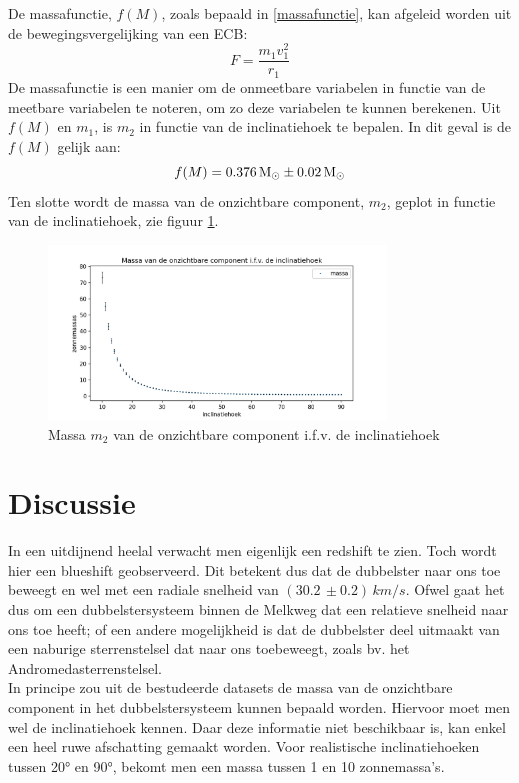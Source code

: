 \documentclass[12pt]{article}
\begin{document}
	
	\pagebreak
	\noindent
	De massafunctie, $f(M)$, zoals bepaald in \eqref{massafunctie}, kan afgeleid worden uit de bewegingsvergelijking van een ECB:
	\begin{equation}
	F = \frac{m_1 v_1^2}{r_1}
	\end{equation}
	De massafunctie is een manier om de onmeetbare variabelen in functie van de meetbare variabelen te noteren, om zo deze variabelen te kunnen berekenen.
	Uit $f(M)$ en $m_1$, is $m_2$ in functie van de inclinatiehoek te bepalen. In dit geval is de $f(M)$ gelijk aan:
	\begin{equation}
		f(M) = 0.376 \,\textup{M}_\odot \pm 0.02\,\textup{M}_\odot
	\end{equation} 
	Ten slotte wordt de massa van de onzichtbare component, $m_2$, geplot in functie van de inclinatiehoek, zie figuur \ref{fig 5:massa ifv inclinatiehoek}.
	\begin{figure}[h]
		\centering
		\includegraphics[width=0.8\textwidth]{massa ifv inclinatiehoek.png}
		\caption{Massa $m_2$ van de onzichtbare component i.f.v. de inclinatiehoek}
		\label{fig 5:massa ifv inclinatiehoek}
	\end{figure}
	\newpage
\section{Discussie}
In een uitdijnend heelal verwacht men eigenlijk een redshift te zien. Toch wordt hier een blueshift geobserveerd.
Dit betekent dus dat de dubbelster naar ons toe beweegt en wel met een radiale snelheid van $(30.2\,\pm0.2)\,km/s$.
 Ofwel gaat het dus om een dubbelstersysteem binnen de Melkweg dat een relatieve snelheid naar ons toe heeft; of een andere mogelijkheid is 
dat de dubbelster deel uitmaakt van een naburige sterrenstelsel dat naar ons toebeweegt, zoals bv. het Andromedasterrenstelsel. 
\\
In principe zou uit de bestudeerde datasets de massa van de onzichtbare component in het dubbelstersysteem kunnen bepaald worden. Hiervoor moet men wel de inclinatiehoek kennen. Daar deze informatie niet beschikbaar is, kan enkel een heel ruwe afschatting gemaakt worden. Voor realistische 
inclinatiehoeken tussen 20° en 90°, bekomt men een massa tussen 1 en 10 zonnemassa's.
\end{document}

